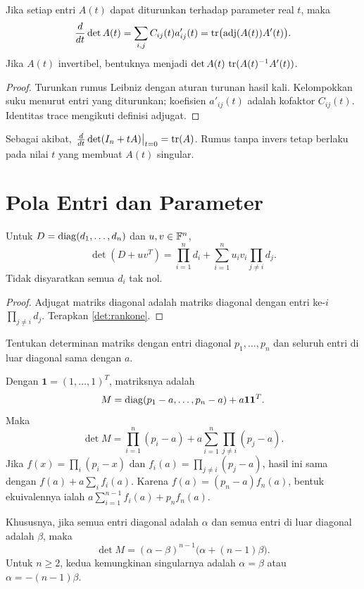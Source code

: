 \begin{prop}
      Jika setiap entri $A(t)$ dapat diturunkan terhadap parameter real $t$,
      maka
      \[
            \frac{d}{dt}\det A(t)
            =\sum_{i,j}C_{ij}(t)a'_{ij}(t)
            =\operatorname{tr}\bigl(\operatorname{adj}(A(t))A'(t)\bigr).
      \]
      Jika $A(t)$ invertibel, bentuknya menjadi
      $\det A(t)\,\operatorname{tr}(A(t)^{-1}A'(t))$.
\end{prop}
\begin{proof}
      Turunkan rumus Leibniz dengan aturan turunan hasil kali.
      Kelompokkan suku menurut entri yang diturunkan; koefisien
      $a'_{ij}(t)$ adalah kofaktor $C_{ij}(t)$.
      Identitas trace mengikuti definisi adjugat.
\end{proof}
Sebagai akibat, $\left.\frac{d}{dt}\det(I_n+tA)\right|_{t=0}=\operatorname{tr}(A)$.
Rumus tanpa invers tetap berlaku pada nilai $t$ yang membuat $A(t)$ singular.

\section{Pola Entri dan Parameter}
\label{det:parameter}

\begin{thm}
      \label{det:diagrankone}
      Untuk $D=\operatorname{diag}(d_1,\ldots,d_n)$ dan $u,v\in\mathbb{F}^n$,
      \[
            \det(D+uv^T)=\prod_{i=1}^n d_i
            +\sum_{i=1}^n u_iv_i\prod_{j\ne i}d_j.
      \]
      Tidak disyaratkan semua $d_i$ tak nol.
\end{thm}
\begin{proof}
      Adjugat matriks diagonal adalah matriks diagonal dengan entri ke-$i$
      $\prod_{j\ne i}d_j$. Terapkan \autoref{det:rankone}.
\end{proof}

\begin{exam}
      Tentukan determinan matriks dengan entri diagonal $p_1,\ldots,p_n$
      dan seluruh entri di luar diagonal sama dengan $a$.
\end{exam}
\begin{solution}
      Dengan $\boldsymbol{1}=(1,\ldots,1)^T$, matriksnya adalah
      \[
            M=\operatorname{diag}(p_1-a,\ldots,p_n-a)+a\boldsymbol{1}\boldsymbol{1}^T.
      \]
      Maka
      \[
            \det M=\prod_{i=1}^n(p_i-a)
            +a\sum_{i=1}^n\prod_{j\ne i}(p_j-a).
      \]
      Jika $f(x)=\prod_i(p_i-x)$ dan $f_i(a)=\prod_{j\ne i}(p_j-a)$,
      hasil ini sama dengan $f(a)+a\sum_i f_i(a)$.
      Karena $f(a)=(p_n-a)f_n(a)$, bentuk ekuivalennya ialah
      $a\sum_{i=1}^{n-1}f_i(a)+p_nf_n(a)$.

      Khususnya, jika semua entri diagonal adalah $\alpha$ dan semua entri
      di luar diagonal adalah $\beta$, maka
      \[
            \boxed{\det M=(\alpha-\beta)^{n-1}
                  \bigl(\alpha+(n-1)\beta\bigr).}
      \]
      Untuk $n\ge2$, kedua kemungkinan
      singularnya adalah $\alpha=\beta$ atau $\alpha=-(n-1)\beta$.
\end{solution}

